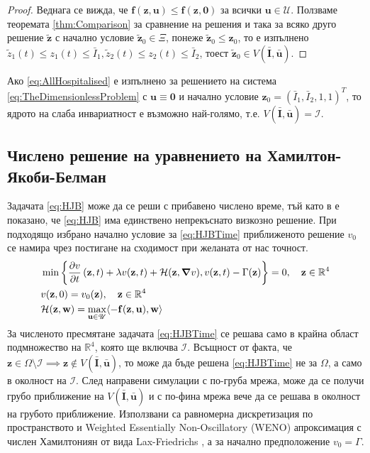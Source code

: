 \begin{proof}
  Веднага се вижда, че $\mathbf{f}(\mathbf{z}, \mathbf{u}) \leq \mathbf{f}(\mathbf{z}, \mathbf{0})$ за всички $\mathbf{u} \in \mathscr{U}$.
  Ползваме теоремата \eqref{thm:Comparison} за сравнение на решения и така за всяко друго решение $\tilde{\mathbf{z}}$ с начално условие $\tilde{\mathbf{z}}_0 \in \Xi$, понеже $\tilde{\mathbf{z}}_0 \leq \mathbf{z}_0$, то е изпълнено $\tilde{z}_1(t) \leq z_1(t) \leq \bar{I}_1, \tilde{z}_2(t) \leq z_2(t) \leq \bar{I}_2$, тоест $\tilde{\mathbf{z}}_0 \in V(\bar{\mathbf{I}}, \bar{\mathbf{u}})$.
\end{proof}

\begin{corollary}
  Ако \eqref{eq:AllHospitalised} е изпълнено за решението на система \eqref{eq:TheDimensionlessProblem} с $\mathbf{u} \equiv \mathbf{0}$ и начално условие $\mathbf{z}_0 = (\bar{I}_1, \bar{I}_2, 1, 1)^T$, то ядрото на слаба инвариатност е възможно най-голямо, т.е. $V(\bar{\mathbf{I}}, \bar{\mathbf{u}}) = \mathscr{I}$.
\end{corollary}

\subsection{Числено решение на уравнението на Хамилтон-Якоби-Белман}
Задачата \eqref{eq:HJB} може да се реши с прибавено числено време, тъй като в \cite{Zidani2013} е показано, че \eqref{eq:HJB} има единствено непрекъснато визкозно решение.
При подходящо избрано начално условие за \eqref{eq:HJBTime} приближеното решение $v_0$ се намира чрез постигане на сходимост при желаната от нас точност.
\begin{equation}
  \label{eq:HJBTime}
  \begin{split}
    &\min\left\{\pdv{v}{t}\left(\mathbf{z}, t\right) + \lambda v(\mathbf{z}, t) + \mathcal{H}(\mathbf{z}, \grad{v}), v(\mathbf{z}, t) - \Gamma(\mathbf{z})\right\} = 0, \quad \mathbf{z} \in \mathbb{R}^4 \\
    &v(\mathbf{z}, 0) = v_0(\mathbf{z}), \quad \mathbf{z} \in \mathbb{R}^4 \\
    &\mathcal{H}(\mathbf{z}, \mathbf{w}) = \max_{\mathbf{u} \in \mathscr{U}} \langle -\mathbf{f}(\mathbf{z}, \mathbf{u}), \mathbf{w} \rangle
  \end{split}
\end{equation}
За численото пресмятане задачата \eqref{eq:HJBTime} се решава само в крайна област подмножество на $\mathbb{R}^4$, която ще включва $\mathscr{I}$.
Всъщност от факта, че $\mathbf{z} \in \Omega \setminus \mathscr{I} \implies \mathbf{z} \notin V(\bar{\mathbf{I}}, \bar{\mathbf{u}})$, то може да бъде решена \eqref{eq:HJBTime} не за $\Omega$, а само в околност на $\mathscr{I}$.
След направени симулации с по-груба мрежа, може да се получи грубо приближение на $V(\bar{\mathbf{I}}, \bar{\mathbf{u}})$ и с по-фина мрежа вече да се решава в околност на грубото приближение.
Използвани са равномерна дискретизация по пространството и Weighted Essentially Non-Oscillatory (WENO) \cite[глава~3.4]{Osher2003} апроксимация с числен Хамилтониян от вида Lax-Friedrichs \cite[глава~5.3]{Osher2003}, а за начално предположение $v_0 = \Gamma$.

